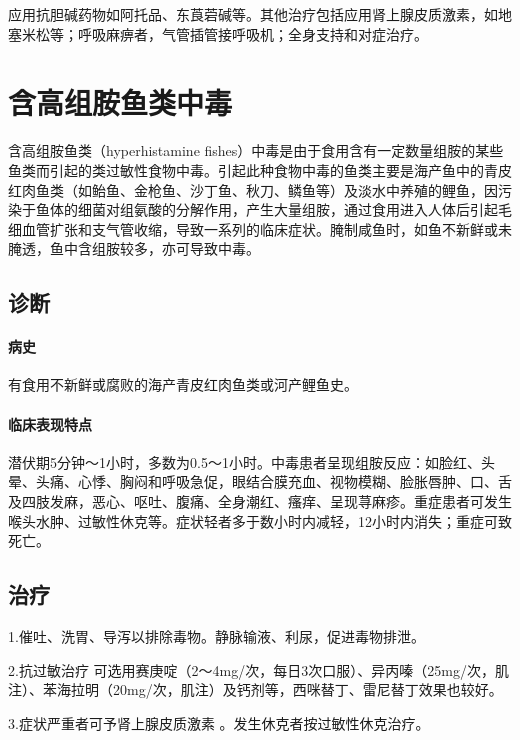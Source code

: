 应用抗胆碱药物如阿托品、东莨菪碱等。其他治疗包括应用肾上腺皮质激素，如地塞米松等；呼吸麻痹者，气管插管接呼吸机；全身支持和对症治疗。

\protect\hypertarget{text00176.html}{}{}

\section{含高组胺鱼类中毒}

含高组胺鱼类（hyperhistamine
fishes）中毒是由于食用含有一定数量组胺的某些鱼类而引起的类过敏性食物中毒。引起此种食物中毒的鱼类主要是海产鱼中的青皮红肉鱼类（如鲐鱼、金枪鱼、沙丁鱼、秋刀、鳞鱼等）及淡水中养殖的鲤鱼，因污染于鱼体的细菌对组氨酸的分解作用，产生大量组胺，通过食用进入人体后引起毛细血管扩张和支气管收缩，导致一系列的临床症状。腌制咸鱼时，如鱼不新鲜或未腌透，鱼中含组胺较多，亦可导致中毒。

\subsection{诊断}

\paragraph{病史}

有食用不新鲜或腐败的海产青皮红肉鱼类或河产鲤鱼史。

\paragraph{临床表现特点}

潜伏期5分钟～1小时，多数为0.5～1小时。中毒患者呈现组胺反应：如脸红、头晕、头痛、心悸、胸闷和呼吸急促，眼结合膜充血、视物模糊、脸胀唇肿、口、舌及四肢发麻，恶心、呕吐、腹痛、全身潮红、瘙痒、呈现荨麻疹。重症患者可发生喉头水肿、过敏性休克等。症状轻者多于数小时内减轻，12小时内消失；重症可致死亡。

\subsection{治疗}

1.催吐、洗胃、导泻以排除毒物。静脉输液、利尿，促进毒物排泄。

2.抗过敏治疗
可选用赛庚啶（2～4mg/次，每日3次口服）、异丙嗪（25mg/次，肌注）、苯海拉明（20mg/次，肌注）及钙剂等，西咪替丁、雷尼替丁效果也较好。

3.症状严重者可予肾上腺皮质激素 。发生休克者按过敏性休克治疗。

